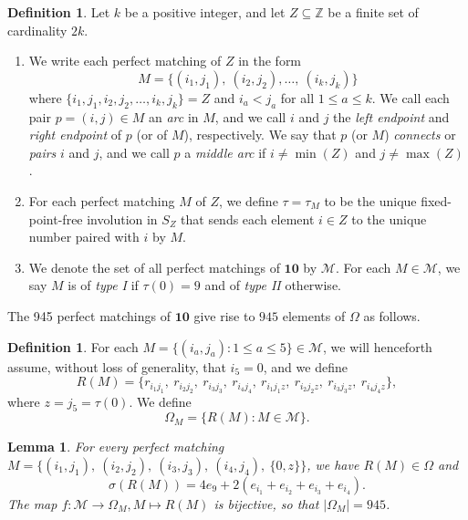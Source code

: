 \documentclass[11pt]{amsart}
\theoremstyle{plain}
\newtheorem{lemma}[theorem]{Lemma}
\theoremstyle{definition}
\newtheorem{defn}[theorem]{Definition}
\theoremstyle{remark}
\numberwithin{equation}{section}
\newcommand{\Z}{{\mathbb Z}}
\newcommand{\ra}{\rightarrow}
\newcommand{\calm}{\mathcal{M}}
\newcommand{\rr}{r}
\newcommand{\ten}{\mathbf{10}}
\newcommand{\ob}{\Omega}
\newcommand{\mob}{\Omega_M}
\newcommand{\se}{\subseteq}
\newcommand{\abs}[1]{\lvert #1 \rvert}
\begin{document}
\begin{defn}
\label{defn:mdef}
Let $k$ be a positive integer, and let $Z\se \Z$ be a finite set of cardinality $2k$.
\begin{enumerate}
  \item We write each {perfect matching} of $Z$ in the form 
    \begin{equation}
\label{eq:matching}
M = \{(i_1, j_1), \ (i_2, j_2), \dots, \ (i_k, j_k)\}
\end{equation}
where $\{i_1,j_1,i_2,j_2,\dots, i_k,j_k\}=Z$ and $i_a<j_a$ for all $1\le
a\le k$. We call each pair $p=(i,j)\in M$ an \emph{arc} in $M$, and we call $i$
and $j$ the \emph{left endpoint} and \emph{right endpoint} of $p$ (or of $M$),
respectively. We say that $p$ (or $M$) \emph{connects} or \emph{pairs} $i$ and
$j$, and we call $p$ a \emph{middle arc} if $i\neq \min(Z)$ and $j\neq \max(Z)$. 

\item For each perfect matching $M$ of $Z$, we define $\tau=\tau_M$ to be the unique
  fixed-point-free involution in $S_Z$ that sends each element $i\in Z$ to
  the unique number paired with $i$ by $M$. 

\item We denote the set of all perfect matchings of $\ten$ by $\calm$. For each
$M\in \calm$, we say $M$ is of \emph{type I} if $\tau(0)=9$ and of \emph{type II}
otherwise. 
\end{enumerate} 
\end{defn}

The 945 perfect matchings of $\ten$ give rise to $945$ elements of $\ob$ as
follows.  


\begin{defn}
\label{defn:mob_construction}
For each $M=\{(i_a,j_a):1\le a\le 5\}\in \calm$, we will henceforth
  assume, without loss of generality, that $i_5=0$, and we define  \[ R(M) =
    \{\rr_{i_1 j_1}, \ \rr_{i_2 j_2}, \ \rr_{i_3 j_3}, \ \rr_{i_4 j_4}, \
      \rr_{i_1 j_1z}, \ \rr_{i_2 j_2z}, \ \rr_{i_3 j_3z}, \ \rr_{i_4 j_4z}\}, \]
    where $z=j_5=\tau(0)$. We define \[ \mob=\{R(M):M\in \calm\}. \]
\end{defn}


\begin{lemma}
\label{lemm:mob_sum}
For every perfect matching $M=\{(i_1, j_1), \ (i_2, j_2), \ (i_3, j_3), \ (i_4,
j_4), \ \{0, z\}\}$, we have $R(M)\in\ob$ and 
\begin{equation}
  \label{eq:mob_sum}
  \sigma(R(M)) = 4e_9 + 2(e_{i_1} + e_{i_2} + e_{i_3} + e_{i_4}).
\end{equation}
The map $f: \calm\ra \mob, M\mapsto R(M)$ is bijective, so that
$\abs{\mob}=945$.
\end{lemma}
\end{document}
